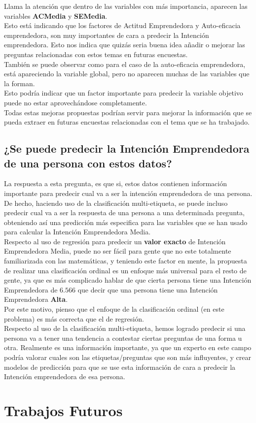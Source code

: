\linebreak
Llama la atención que dentro de las variables con más importancia, aparecen las variables \textbf{ACMedia} y \textbf{SEMedia}. \\
Esto está indicando que los factores de Actitud Emprendedora y Auto-eficacia emprendedora, son muy importantes de cara a predecir la Intención emprendedora. Esto nos indica que quizás seria buena idea añadir o mejorar las preguntas relacionadas con estos temas en futuras encuestas. \\
También se puede observar como para el caso de la auto-eficacia emprendedora, está apareciendo la variable global, pero no aparecen muchas de las variables que la forman.\\
Esto podría indicar que un factor importante para predecir la variable objetivo puede no estar aprovechándose completamente.\\
\linebreak
Todas estas mejoras propuestas podrían servir para mejorar la información que se pueda extraer en futuras encuestas relacionadas con el tema que se ha trabajado.
\clearpage
\section{¿Se puede predecir la Intención Emprendedora de una persona con estos datos?}
La respuesta a esta pregunta, es que si, estos datos contienen información importante para predecir cual va a ser la intención emprendedora de una persona.\\
\linebreak
De hecho, haciendo uso de la clasificación multi-etiqueta, se puede incluso predecir cual va a ser la respuesta de una persona a una determinada pregunta, obteniendo así una predicción más especifica para las variables que se han usado para calcular la Intención Emprendedora Media.\\
\linebreak
Respecto al uso de regresión para predecir un \textbf{valor exacto }de Intención Emprendedora Media, puede no ser fácil para gente que no este totalmente familiarizada con las matemáticas, y teniendo este factor en mente, la propuesta de realizar una clasificación ordinal es un enfoque más universal para el resto de gente, ya que es más complicado hablar de que cierta persona tiene una Intención Emprendedora de $6.566$ que decir que una persona tiene una Intención Emprendedora \textbf{Alta}. \\
Por este motivo, pienso que el enfoque de la clasificación ordinal (en este problema) es más correcta que el de regresión.\\
\linebreak
Respecto al uso de la clasificación multi-etiqueta, hemos logrado predecir si una persona va a tener una tendencia a contestar ciertas preguntas de una forma u otra. Realmente es una información importante, ya que un experto en este campo podría valorar cuales son las etiquetas/preguntas que son más influyentes, y crear modelos de predicción para que se use esta información de cara a predecir la Intención emprendedora de esa persona.\\
\clearpage 
\chapter{Trabajos Futuros}